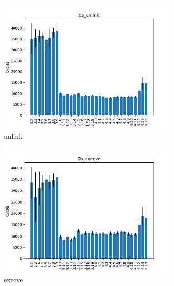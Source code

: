 \documentclass{article}
\begin{document}
\begin{figure}[h!]
    \centering
    \begin{subfigure}[b]{0.3\textwidth}
        \includegraphics[width=\textwidth]{../report/0a_unlink.png}
        \caption{unlink}
    \end{subfigure}
    \begin{subfigure}[b]{0.3\textwidth}
        \includegraphics[width=\textwidth]{../report/0b_execve.png}
        \caption{execve}
    \end{subfigure}
    \begin{subfigure}[b]{0.3\textwidth}

\end{subfigure}
\end{figure}
\end{document}
